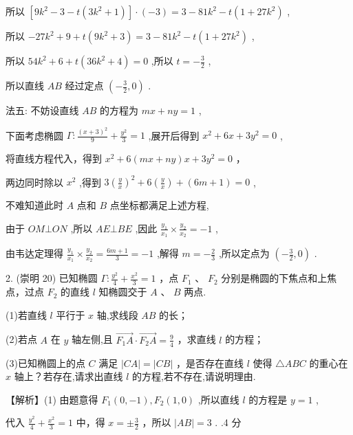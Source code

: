 \documentclass[10pt]{article}
\begin{document}
所以 \(\left\lbrack  {9{k}^{2} - 3 - t\left( {3{k}^{2} + 1}\right) }\right\rbrack   \cdot  \left( {-3}\right)  = 3 - {81}{k}^{2} - t\left( {1 + {27}{k}^{2}}\right)\) ,

所以 \(- {27}{k}^{2} + 9 + t\left( {9{k}^{2} + 3}\right)  = 3 - {81}{k}^{2} - t\left( {1 + {27}{k}^{2}}\right)\) ,

所以 \({54}{k}^{2} + 6 + t\left( {{36}{k}^{2} + 4}\right)  = 0\) ,所以 \(t =  - \frac{3}{2}\) ,

所以直线 \({AB}\) 经过定点 \(\left( {-\frac{3}{2},0}\right)\) .

法五: 不妨设直线 \({AB}\) 的方程为 \({mx} + {ny} = 1\) ,

下面考虑椭圆 \(\Gamma  : \frac{{\left( x + 3\right) }^{2}}{9} + \frac{{y}^{2}}{3} = 1\) ,展开后得到 \({x}^{2} + {6x} + 3{y}^{2} = 0\) ,

将直线方程代入，得到 \({x}^{2} + 6\left( {{mx} + {ny}}\right) x + 3{y}^{2} = 0\) ，

两边同时除以 \({x}^{2}\) ,得到 \(3{\left( \frac{y}{x}\right) }^{2} + 6\left( \frac{y}{x}\right)  + \left( {{6m} + 1}\right)  = 0\) ,

不难知道此时 \(A\) 点和 \(B\) 点坐标都满足上述方程,

由于 \({OM} \bot  {ON}\) ,所以 \({AE} \bot  {BE}\) ,因此 \(\frac{{y}_{1}}{{x}_{1}} \times  \frac{{y}_{2}}{{x}_{2}} =  - 1\) ,

由韦达定理得 \(\frac{{y}_{1}}{{x}_{1}} \times  \frac{{y}_{2}}{{x}_{2}} = \frac{{6m} + 1}{3} =  - 1\) ,解得 \(m =  - \frac{2}{3}\) ,所以定点为 \(\left( {-\frac{3}{2},0}\right)\) .

2. (崇明 20) 已知椭圆 \(\Gamma  : \frac{{y}^{2}}{4} + \frac{{x}^{2}}{3} = 1\) ，点 \({F}_{1}\) 、 \({F}_{2}\) 分别是椭圆的下焦点和上焦点，过点 \({F}_{2}\) 的直线 \(l\) 知椭圆交于 \(A\) 、 \(B\) 两点.

(1)若直线 \(l\) 平行于 \(x\) 轴,求线段 \({AB}\) 的长；

(2)若点 \(A\) 在 \(y\) 轴左侧,且 \(\overrightarrow{{F}_{1}A} \cdot  \overrightarrow{{F}_{2}A} = \frac{9}{4}\) ，求直线 \(l\) 的方程；

(3)已知椭圆上的点 \(C\) 满足 \(\left| {CA}\right|  = \left| {CB}\right|\) ，是否存在直线 \(l\) 使得 \(\bigtriangleup  {ABC}\) 的重心在 \(x\) 轴上？若存在,请求出直线 \(l\) 的方程,若不存在,请说明理由.

【解析】(1) 由题意得 \({F}_{1}\left( {0, - 1}\right) ,{F}_{2}\left( {1,0}\right)\) ,所以直线 \(l\) 的方程是 \(y = 1\) ,

代入 \(\frac{{y}^{2}}{4} + \frac{{x}^{2}}{3} = 1\) 中，得 \(x =  \pm  \frac{3}{2}\) ，所以 \(\left| {AB}\right|  = 3\) . .4 分
\end{document}
